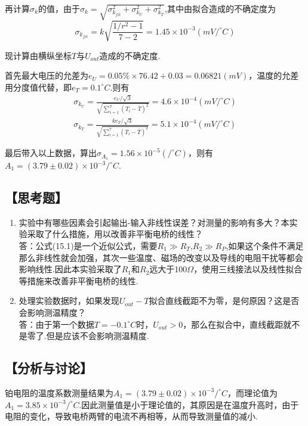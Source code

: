 \documentclass[12pt,a4paper,UTF8]{ctexart}
\begin{document}
\par
再计算$\sigma_k$的值，由于$\sigma_k=\sqrt{\sigma_{k_{fit}}^2+\sigma_{k_U}^2+\sigma_{k_T}^2}$,其中由拟合造成的不确定度为
\begin{equation*}
\sigma_{k_{fit}}=k\sqrt{\frac{1/r^2-1}{7-2}}=1.45\times10^{-3}(mV/^{\circ}C)
\end{equation*}
\par
现计算由横纵坐标$T$与$U_{out}$造成的不确定度.\par
首先最大电压的允差为$e_U=0.05\%\times 76.42+0.03=0.06821(mV)$，温度的允差用分度值代替，即$e_T=0.1^{\circ}C$.则有
\begin{align*}
\sigma_{k_U}=\frac{e_U/\sqrt{3}}{\sqrt{\sum_{i=1}^7(T_i-\bar T)^2}}=4.6\times10^{-4}(mV/^{\circ}C)\\
\sigma_{k_T}=\frac{ke_T/\sqrt{3}}{\sqrt{\sum_{i=1}^7(T_i-\bar T)^2}}=5.1\times10^{-4}(mV/^{\circ}C)
\end{align*}
\par
最后带入以上数据，算出$\sigma_{A_1}=1.56\times10^{-5}(/^{\circ}C)$，则有$A_1=(3.79\pm0.02)\times10^{-3}/^{\circ}C$.
\subsection*{【思考题】}
\begin{enumerate}[(1)]
\item 实验中有哪些因素会引起输出-输入非线性误差？对测量的影响有多大？本实验采取了什么措施，用以改善非平衡电桥的线性？ \\
答：公式(15.1)是一个近似公式，需要$R_1 \gg R_T$,$R_2 \gg R_P$,如果这个条件不满足那么非线性就会加强，其次一些温度、磁场的改变以及导线的电阻干扰等都会影响线性.因此本实验采取了$R_1$和$R_2$远大于100$\Omega$，使用三线接法以及线性拟合等措施来改善非平衡电桥的线性.
\item 处理实验数据时，如果发现$U_{out}-T$拟合直线截距不为零，是何原因？这是否会影响测温精度？ \\
答：由于第一个数据$T=-0.1^{\circ}C$时，$U_{out}>0$，那么在拟合中，直线截距就不是零了.但是应该不会影响测温精度.
\end{enumerate}
\subsection*{【分析与讨论】}
铂电阻的温度系数测量结果为$A_1=(3.79\pm0.02)\times10^{-3}/^{\circ}C$，而理论值为$A_1=3.85\times10^{-3}/^{\circ}C$.因此测量值是小于理论值的，其原因是在温度升高时，由于电阻的变化，导致电桥两臂的电流不再相等，从而导致测量值的减小.
\end{document}
